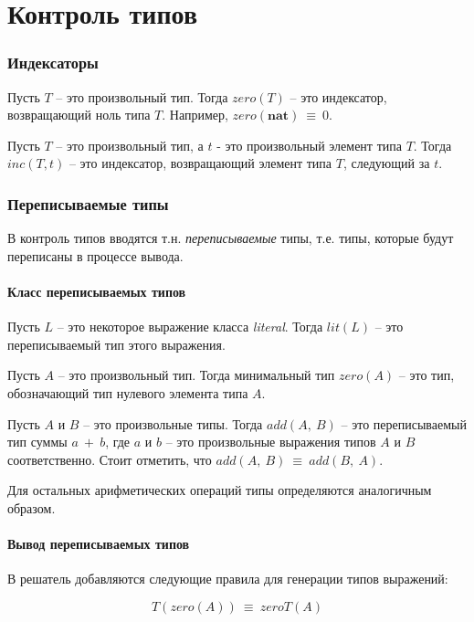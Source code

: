 \documentclass[10pt,a4paper]{article}
\begin{document}
\part*{Контроль типов}

\section{Индексаторы}

Пусть $ T $ -- это произвольный тип. Тогда $ zero(T) $ -- это индексатор, возвращающий ноль типа $ T $.
Например, $ zero(\textbf{nat})~\equiv~0 $.

Пусть $ T $ -- это произвольный тип, а $ t $ - это произвольный элемент типа $ T $. Тогда $ inc(T, t) $ -- это
индексатор, возвращающий элемент типа $ T $, следующий за $ t $.

\section{Переписываемые типы}

В контроль типов вводятся т.н. \textit{переписываемые} типы, т.е. типы, которые будут переписаны в
процессе вывода.

\subsection{Класс переписываемых типов}

Пусть $ L $ -- это некоторое выражение класса \textit{literal}. Тогда $ lit(L) $ -- это переписываемый тип
этого выражения.

Пусть $ A $ -- это произвольный тип. Тогда минимальный тип $ zero(A) $ -- это тип, обозначающий тип нулевого
элемента типа $ A $.

Пусть $ A $ и $ B $ -- это произвольные типы. Тогда $ add(A,~B) $ -- это переписываемый тип суммы
$ a~+~b $, где $ a $ и $ b $ -- это произвольные выражения типов $ A $ и $ B $ соответственно. Стоит
отметить, что $ add(A, ~B)~\equiv~add(B,~A) $.

Для остальных арифметических операций типы определяются аналогичным образом.

\subsection{Вывод переписываемых типов}

В решатель добавляются следующие правила для генерации типов выражений:

\begin{equation}
T(zero(A))~\equiv~zeroT(A)
\end{equation}
\end{document}
